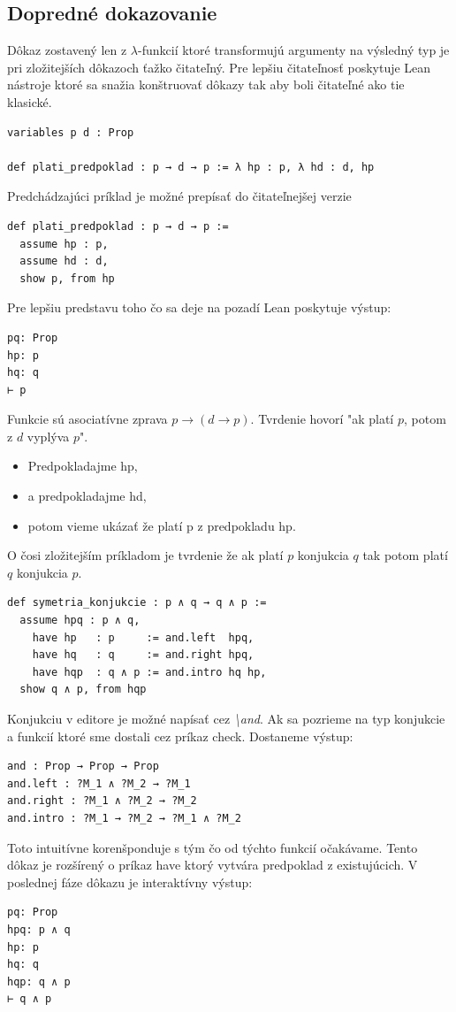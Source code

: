 \documentclass[a4paper,10pt,oneside]{report}%
\begin{document}
\subsection{Dopredné dokazovanie}
    Dôkaz zostavený len z $\lambda$-funkcií ktoré transformujú argumenty
na výsledný typ je pri zložitejších dôkazoch ťažko čitateľný.
    Pre lepšiu čitateľnosť poskytuje Lean nástroje ktoré sa snažia konštruovať dôkazy tak
aby boli čitateľné ako tie klasické.
\begin{lstlisting}
variables p d : Prop

def plati_predpoklad : p → d → p := λ hp : p, λ hd : d, hp
\end{lstlisting}
    Predchádzajúci príklad je možné prepísať do čitateľnejšej verzie
\begin{lstlisting}
def plati_predpoklad : p → d → p :=
  assume hp : p,
  assume hd : d,
  show p, from hp
\end{lstlisting}
Pre lepšiu predstavu toho čo sa deje na pozadí Lean poskytuje výstup:
\begin{lstlisting}
pq: Prop
hp: p
hq: q
⊢ p
\end{lstlisting}
    Funkcie sú asociatívne zprava $p \to ( d \to p )$.
    Tvrdenie hovorí "ak platí $p$, potom z $d$ vyplýva $p$".
\begin{itemize}
    \item Predpokladajme hp,
    \item a predpokladajme hd,
    \item potom vieme ukázať že platí p z predpokladu hp.
\end{itemize}
    O čosi zložitejším príkladom je tvrdenie že ak platí $p$ konjukcia $q$ tak potom
platí $q$ konjukcia $p$.
\begin{lstlisting}
def symetria_konjukcie : p ∧ q → q ∧ p :=
  assume hpq : p ∧ q,
    have hp   : p     := and.left  hpq,
    have hq   : q     := and.right hpq,
    have hqp  : q ∧ p := and.intro hq hp,
  show q ∧ p, from hqp
\end{lstlisting}
    Konjukciu v editore je možné napísať cez \emph{\textbackslash and}.
    Ak sa pozrieme na typ konjukcie a funkcií ktoré sme dostali cez príkaz check.
    Dostaneme výstup:
\begin{lstlisting}
and : Prop → Prop → Prop
and.left : ?M_1 ∧ ?M_2 → ?M_1
and.right : ?M_1 ∧ ?M_2 → ?M_2
and.intro : ?M_1 → ?M_2 → ?M_1 ∧ ?M_2
\end{lstlisting}
    Toto intuitívne korenšponduje s tým čo od týchto funkcií očakávame.
    Tento dôkaz je rozšírený o príkaz have ktorý vytvára predpoklad z existujúcich.
    V poslednej fáze dôkazu je interaktívny výstup:
\begin{lstlisting}
pq: Prop
hpq: p ∧ q
hp: p
hq: q
hqp: q ∧ p
⊢ q ∧ p
\end{lstlisting}
\end{document}

